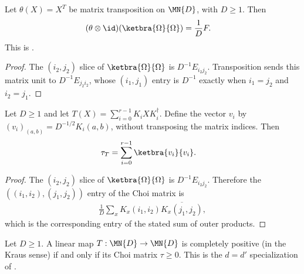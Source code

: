 \begin{theorem}\label{thm:choi_transpose_flip}
    \leanok
    Let $\theta(X)=X^T$ be matrix transposition on $\MN{D}$, with $D \ge 1$.
    Then
    \begin{align}
        (\theta\otimes\id)(\ketbra{\Omega}{\Omega})
        &= \frac{1}{D}F.
        \label{eq:representations_transpose_choi}
    \end{align}
    This is \cite[Equation~3.1]{Wolf2012Quantum}.
\end{theorem}

\begin{proof}\leanok
    The $(i_2,j_2)$ slice of $\ketbra{\Omega}{\Omega}$ is
    $D^{-1}E_{i_2j_2}$. Transposition sends this matrix unit to
    $D^{-1}E_{j_2i_2}$, whose $(i_1,j_1)$ entry is $D^{-1}$ exactly when
    $i_1=j_2$ and $i_2=j_1$.
\end{proof}

\begin{theorem}\label{thm:choi_kraus_outer_product}
    \leanok
    Let $D\geq1$ and let
    $T(X)=\sum_{i=0}^{r-1}K_iXK_i^\dagger$. Define the vector $v_i$ by
    $(v_i)_{(a,b)}=D^{-1/2}K_i(a,b)$, without transposing the matrix indices.
    Then
    \begin{align}
        \tau_T
        &= \sum_{i=0}^{r-1}\ketbra{v_i}{v_i}.
        \label{eq:representations_choi_kraus_outer_product}
    \end{align}
\end{theorem}

\begin{proof}\leanok
    The $(i_2,j_2)$ slice of $\ketbra{\Omega}{\Omega}$ is
    $D^{-1}E_{i_2j_2}$. Therefore the
    $((i_1,i_2),(j_1,j_2))$ entry of the Choi matrix is
    \begin{align}
        \frac{1}{D}\sum_x K_x(i_1,i_2)\overline{K_x(j_1,j_2)},
    \end{align}
    which is the corresponding entry of the stated sum of outer products.
\end{proof}

\begin{theorem}\label{thm:cp_iff_choi_posSemidef}
    \leanok
    Let $D\geq1$. A linear map $T : \MN{D} \to \MN{D}$ is completely
    positive (in the Kraus sense) if and only if its Choi matrix $\tau \ge 0$.
    This is the $d=d'$ specialization of
    \cite[Proposition~2.1]{Wolf2012Quantum}.
\end{theorem}

